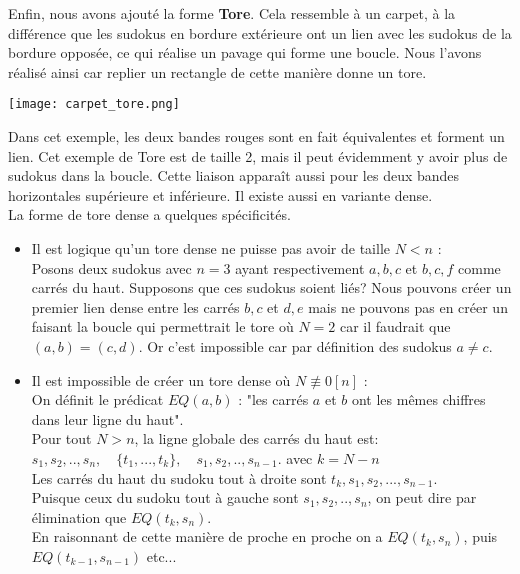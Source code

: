 \documentclass[a4paper]{article}
\begin{document}
\begin{justify}
    \qquad Enfin, nous avons ajouté la forme \textbf{Tore}. Cela ressemble à un carpet, à la différence que les sudokus en bordure extérieure ont un lien avec les sudokus de la bordure opposée, ce qui réalise un pavage qui forme une boucle. Nous l'avons réalisé ainsi car replier un rectangle de cette manière donne un tore.
    
    \begin{center}
         \texttt{[image: carpet\_tore.png]}
    \end{center}
    
    Dans cet exemple, les deux bandes rouges sont en fait équivalentes et forment un lien. Cet exemple de Tore est de taille 2, mais il peut évidemment y avoir plus de sudokus dans la boucle. Cette liaison apparaît aussi pour les deux bandes horizontales supérieure et inférieure. Il existe aussi en variante dense. \\

    \noindent La forme de tore dense a quelques spécificités.
    \begin{itemize}
        \item Il est logique qu'un tore dense ne puisse pas avoir de taille $N<n$ : \\
        Posons deux sudokus avec $n=3$ ayant respectivement $a,b,c$ et $b,c,f$ comme carrés du haut. Supposons que ces sudokus soient liés? Nous pouvons créer un premier lien dense entre les carrés $b,c$ et $d,e$ mais ne pouvons pas en créer un faisant la boucle qui permettrait le tore où $N=2$ car il faudrait que $(a,b) = (c,d)$. Or c'est impossible car par définition des sudokus $a \ne c$.
        
        \item Il est impossible de créer un tore dense où $N\not\equiv0[n]$ : \\
        On définit le prédicat $EQ(a,b)$ : "les carrés $a$ et $b$ ont les mêmes chiffres dans leur ligne du haut". \\
        Pour tout $N>n$, la ligne globale des carrés du haut est: \\ 
        $s_1,s_2,..,s_n, \quad\{t_1,...,t_k\},\quad s_1,s_2,..,s_{n-1}$. avec $k=N-n$ \\
        Les carrés du haut du sudoku tout à droite sont $t_k,s_1,s_2,...,s_{n-1}$. \\
        Puisque ceux du sudoku tout à gauche sont $s_1,s_2,..,s_n$, on peut dire par élimination que $EQ(t_k, s_n)$. \\
        En raisonnant de cette manière de proche en proche on a $EQ(t_k, s_n)$, puis $EQ(t_{k-1}, s_{n-1})$ etc... \\
    

\end{itemize}
\end{justify}
\end{document}
